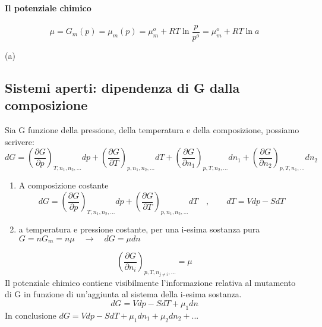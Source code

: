 \documentclass{article}
\newcommand{\so}{\quad \rightarrow \quad}
\begin{document}
\paragraph{Il potenziale chimico}
\begin{equation*}
    \mu=G_m(p)=\mu_m(p)=\mu_m^o+RT\ln{\frac{p}{p^o}}=\mu_m^o+RT\ln{a}
\end{equation*}

(\gls{a})


\subsection{Sistemi aperti: dipendenza di G dalla composizione}
Sia G funzione della pressione, della temperatura e della composizione, possiamo scrivere:
\begin{equation*}
    dG=(\frac{\partial G}{\partial p})_{T,n_1,n_2,...}dp+(\frac{\partial G}{\partial T})_{p,n_1,n_2,...}dT+(\frac{\partial G}{\partial n_1})_{p,T,n_2,...}dn_1+(\frac{\partial G}{\partial n_2})_{p,T,n_1,...}dn_2
\end{equation*}
\begin{enumerate}
    \item A composizione costante
    \begin{equation*}
        dG=(\frac{\partial G}{\partial p})_{T,n_1,n_2,...}dp+(\frac{\partial G}{\partial T})_{p,n_1,n_2,...}dT\quad, \quad \quad dT=Vdp-SdT
    \end{equation*}
    \item a temperatura e pressione costante, per una i-esima sostanza pura $G=nG_m=n\mu \so dG=\mu dn$
\end{enumerate}
\begin{equation*}
    (\frac{\partial G}{\partial n_i})_{p,T,n_{j\neq i},...}=\mu
\end{equation*}
Il potenziale chimico contiene visibilmente l'informazione relativa al mutamento di G in funzione di un'aggiunta al sistema della i-esima sostanza.\\

\begin{equation*}
    dG=Vdp-SdT+\mu_1dn
\end{equation*}
In conclusione $dG=Vdp-SdT+\mu_1dn_1+\mu_2dn_2+...$
\end{document}
